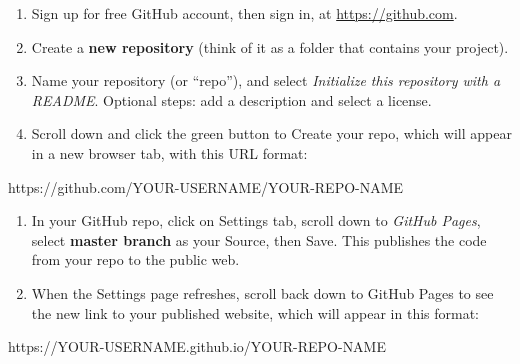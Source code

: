 \documentclass[
  english,
]{book}
\newenvironment{Shaded}{\begin{snugshade}}{\end{snugshade}}
\newcommand{\NormalTok}[1]{#1}
\begin{document}
\begin{enumerate}
\def\labelenumi{\arabic{enumi})}
\item
  Sign up for free GitHub account, then sign in, at \url{https://github.com}.
\item
  Create a \textbf{new repository} (think of it as a folder that contains your project).
\item
  Name your repository (or ``repo''), and select \emph{Initialize this repository with a README}. Optional steps: add a description and select a license.
\item
  Scroll down and click the green button to Create your repo, which will appear in a new browser tab, with this URL format:
\end{enumerate}

\begin{Shaded}
\begin{Highlighting}[]
\NormalTok{https://github.com/YOUR{-}USERNAME/YOUR{-}REPO{-}NAME}
\end{Highlighting}
\end{Shaded}

\begin{enumerate}
\def\labelenumi{\arabic{enumi})}
\setcounter{enumi}{4}
\item
  In your GitHub repo, click on Settings tab, scroll down to \emph{GitHub Pages}, select \textbf{master branch} as your Source, then Save. This publishes the code from your repo to the public web.
\item
  When the Settings page refreshes, scroll back down to GitHub Pages to see the new link to your published website, which will appear in this format:
\end{enumerate}

\begin{Shaded}
\begin{Highlighting}[]
\NormalTok{https://YOUR{-}USERNAME.github.io/YOUR{-}REPO{-}NAME}
\end{Highlighting}
\end{Shaded}
\end{document}
